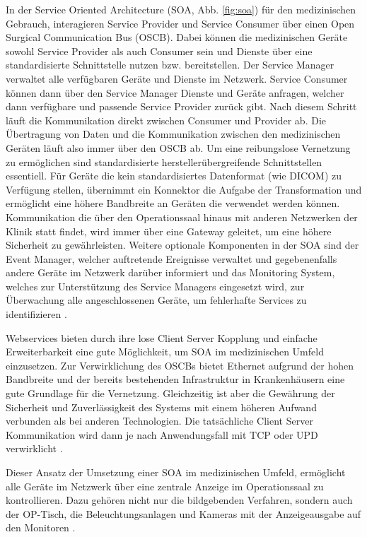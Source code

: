 In der Service Oriented Architecture (SOA, Abb. \ref{fig:soa}) für den medizinischen Gebrauch, interagieren Service Provider und Service Consumer über einen Open Surgical Communication Bus (OSCB). Dabei können die medizinischen Geräte sowohl Service Provider als auch Consumer sein und Dienste über eine standardisierte Schnittstelle nutzen bzw. bereitstellen. Der Service Manager verwaltet alle verfügbaren Geräte und Dienste im Netzwerk. Service Consumer können dann über den Service Manager Dienste und Geräte anfragen, welcher dann verfügbare und passende Service Provider zurück gibt. Nach diesem Schritt läuft die Kommunikation direkt zwischen Consumer und Provider ab. 
Die Übertragung von Daten und die Kommunikation zwischen den medizinischen Geräten läuft also immer über den OSCB ab. Um eine reibungslose Vernetzung zu ermöglichen sind standardisierte herstellerübergreifende Schnittstellen essentiell.  
Für Geräte die kein standardisiertes Datenformat (wie DICOM) zu Verfügung stellen, übernimmt ein Konnektor die Aufgabe der Transformation und ermöglicht eine höhere Bandbreite an Geräten die verwendet werden können. Kommunikation die über den Operationssaal hinaus mit anderen Netzwerken der Klinik statt findet, wird immer über eine Gateway geleitet, um eine höhere Sicherheit zu gewährleisten.
Weitere optionale Komponenten in der SOA sind der Event Manager, welcher auftretende Ereignisse verwaltet und gegebenenfalls andere Geräte im Netzwerk darüber informiert und das Monitoring System, welches zur Unterstützung des Service Managers eingesetzt wird, zur Überwachung alle angeschlossenen Geräte, um fehlerhafte Services zu identifizieren \cite{DerDigitaleOperationssaal}. 

Webservices bieten durch ihre lose Client Server Kopplung und einfache Erweiterbarkeit eine gute Möglichkeit, um SOA im medizinischen Umfeld einzusetzen. Zur Verwirklichung des OSCBs bietet Ethernet aufgrund der hohen Bandbreite und der bereits bestehenden Infrastruktur in Krankenhäusern eine gute Grundlage für die Vernetzung. Gleichzeitig ist aber die Gewährung der Sicherheit und Zuverlässigkeit des Systems mit einem höheren Aufwand verbunden als bei anderen Technologien.
Die tatsächliche Client Server Kommunikation wird dann je nach Anwendungsfall mit TCP oder UPD verwirklicht \cite{DerDigitaleOperationssaal}.

Dieser Ansatz der Umsetzung einer SOA im medizinischen Umfeld, ermöglicht alle Geräte im Netzwerk über eine zentrale Anzeige im Operationssaal zu kontrollieren. Dazu gehören nicht nur die bildgebenden Verfahren, sondern auch der OP-Tisch, die Beleuchtungsanlagen und Kameras mit der Anzeigeausgabe auf den Monitoren \cite{DerDigitaleOperationssaal}.

